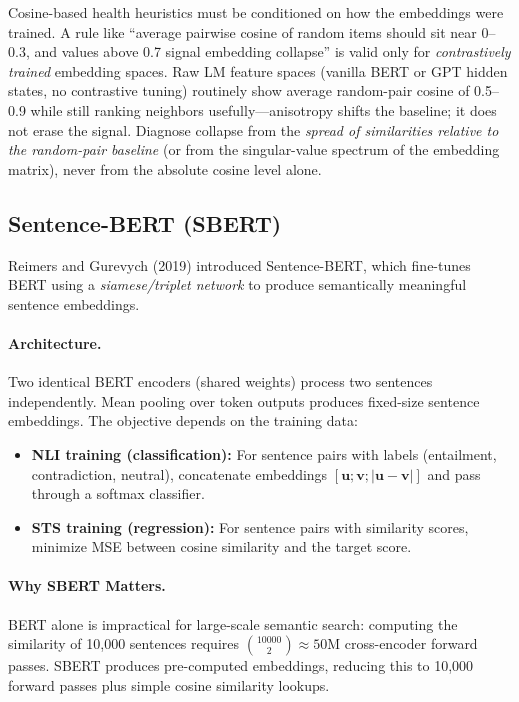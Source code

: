 \begin{warningbox}
Cosine-based health heuristics must be conditioned on how the embeddings
were trained.  A rule like ``average pairwise cosine of random items should
sit near 0--0.3, and values above 0.7 signal embedding collapse'' is valid
only for \emph{contrastively trained} embedding spaces.  Raw LM feature
spaces (vanilla BERT or GPT hidden states, no contrastive tuning) routinely
show average random-pair cosine of 0.5--0.9 while still ranking neighbors
usefully---anisotropy shifts the baseline; it does not erase the signal.
Diagnose collapse from the \emph{spread of similarities relative to the
random-pair baseline} (or from the singular-value spectrum of the embedding
matrix), never from the absolute cosine level alone.
\end{warningbox}

\subsection{Sentence-BERT (SBERT)}

Reimers and Gurevych (2019) introduced Sentence-BERT, which fine-tunes BERT
using a \emph{siamese/triplet network} to produce semantically meaningful
sentence embeddings.

\paragraph{Architecture.}
Two identical BERT encoders (shared weights) process two sentences
independently.  Mean pooling over token outputs produces fixed-size
sentence embeddings.  The objective depends on the training data:

\begin{itemize}
    \item \textbf{NLI training (classification):}  For sentence pairs with
    labels (entailment, contradiction, neutral), concatenate embeddings
    $[\mathbf{u}; \mathbf{v}; |\mathbf{u} - \mathbf{v}|]$ and pass through a
    softmax classifier.
    \item \textbf{STS training (regression):}  For sentence pairs with
    similarity scores, minimize MSE between cosine similarity and the target
    score.
\end{itemize}

\paragraph{Why SBERT Matters.}
BERT alone is impractical for large-scale semantic search: computing the
similarity of 10,000 sentences requires $\binom{10000}{2} \approx 50$M
cross-encoder forward passes.  SBERT produces pre-computed embeddings,
reducing this to 10,000 forward passes plus simple cosine similarity lookups.

